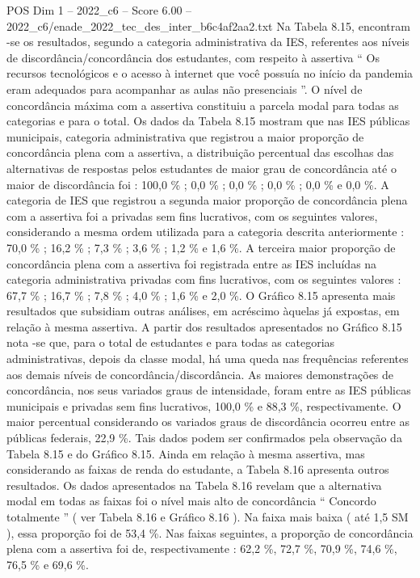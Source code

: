 \begin{textsample}{POS Dim 1 – 2022\_c6 – Score 6.00 – 2022\_c6/enade\_2022\_tec\_des\_inter\_b6c4af2aa2.txt}
Na Tabela 8.15, encontram -se os resultados, segundo a categoria administrativa da IES, referentes aos níveis de discordância/concordância dos estudantes, com respeito à assertiva “ Os recursos tecnológicos e o acesso à internet que você possuía no início da pandemia eram adequados para acompanhar as aulas não presenciais ”.
O nível de concordância máxima com a assertiva constituiu a parcela modal para todas as categorias e para o total.
Os dados da Tabela 8.15 mostram que nas IES públicas municipais, categoria administrativa que registrou a maior proporção de concordância plena com a assertiva, a distribuição percentual das escolhas das alternativas de respostas pelos estudantes de maior grau de concordância até o maior de discordância foi : 100,0 \% ; 0,0 \% ; 0,0 \% ; 0,0 \% ; 0,0 \% e 0,0 \%.
A categoria de IES que registrou a segunda maior proporção de concordância plena com a assertiva foi a privadas sem fins lucrativos, com os seguintes valores, considerando a mesma ordem utilizada para a categoria descrita anteriormente : 70,0 \% ; 16,2 \% ; 7,3 \% ; 3,6 \% ; 1,2 \% e 1,6 \%.
A terceira maior proporção de concordância plena com a assertiva foi registrada entre as IES incluídas na categoria administrativa privadas com fins lucrativos, com os seguintes valores : 67,7 \% ; 16,7 \% ; 7,8 \% ; 4,0 \% ; 1,6 \% e 2,0 \%.
O Gráfico 8.15 apresenta mais resultados que subsidiam outras análises, em acréscimo àquelas já expostas, em relação à mesma assertiva.
A partir dos resultados apresentados no Gráfico 8.15 nota -se que, para o total de estudantes e para todas as categorias administrativas, depois da classe modal, há uma queda nas frequências referentes aos demais níveis de concordância/discordância.
As maiores demonstrações de concordância, nos seus variados graus de intensidade, foram entre as IES públicas municipais e privadas sem fins lucrativos, 100,0 \% e 88,3 \%, respectivamente.
O maior percentual considerando os variados graus de discordância ocorreu entre as públicas federais, 22,9 \%.
Tais dados podem ser confirmados pela observação da Tabela 8.15 e do Gráfico 8.15.
Ainda em relação à mesma assertiva, mas considerando as faixas de renda do estudante, a Tabela 8.16 apresenta outros resultados.
Os dados apresentados na Tabela 8.16 revelam que a alternativa modal em todas as faixas foi o nível mais alto de concordância “ Concordo totalmente ” ( ver Tabela 8.16 e Gráfico 8.16 ).
Na faixa mais baixa ( até 1,5 SM ), essa proporção foi de 53,4 \%.
Nas faixas seguintes, a proporção de concordância plena com a assertiva foi de, respectivamente : 62,2 \%, 72,7 \%, 70,9 \%, 74,6 \%, 76,5 \% e 69,6 \%.

\end{textsample}
